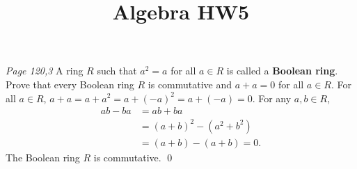 

\title{Algebra HW5}
\author{\asemail}
\maketitle

\begin{enumerate}
	\isep[1em]

\prob
\textit{Page 120,3 }%
A ring $R$ such that $a^2=a$ for all $a\in R$ is called a \textbf{Boolean ring}. Prove that every Boolean ring $R$ is commutative and $a+a=0$ for all $a\in R$. 
\soln
For all $a\in R$, $a+a = a+a^2 = a+(-a)^2 = a+(-a) =0$. For any $a,b\in R$,
\begin{align*}
	ab-ba &= ab+ba \\
	&= (a+b)^2-(a^2+b^2) \\
	&= (a+b)-(a+b)= 0.
\end{align*}
The Boolean ring $R$ is commutative.
\qed


\end{enumerate}
